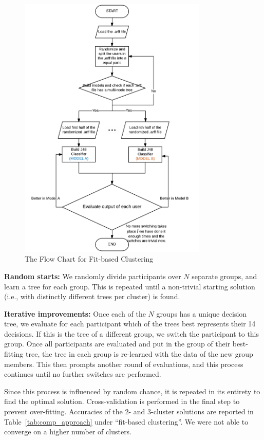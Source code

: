\begin{figure}
	\centering
	\includegraphics[width=0.8\textwidth]{figures/flowchartFit.png}
	\caption{The Flow Chart for Fit-based Clustering}
	\label{fig:flow_chart_fit}
\end{figure}

\textbf{Random starts:} We randomly divide participants over $N$ separate groups, and learn a tree for each group. This is repeated until a non-trivial starting solution (i.e., with distinctly different trees per cluster) is found. 

\textbf{Iterative improvements:} Once each of the $N$ groups has a unique decision tree, we evaluate for each participant which of the trees best represents their 14 decisions. If this is the tree of a different group, we switch the participant to this group. Once all participants are evaluated and put in the group of their best-fitting tree, the tree in each group is re-learned with the data of the new group members. This then prompts another round of evaluations, and this process continues until no further switches are performed. 

Since this process is influenced by random chance, it is repeated in its entirety to find the optimal solution. Cross-validation is performed in the final step to prevent over-fitting. Accuracies of the 2- and 3-cluster solutions are reported in Table~\ref{tab:comp_approach} under ``fit-based clustering''. We were not able to converge on a higher number of clusters. 

